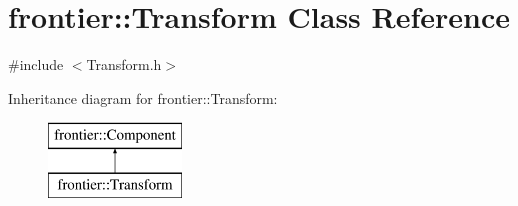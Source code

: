 \hypertarget{classfrontier_1_1_transform}{}\section{frontier\+:\+:Transform Class Reference}
\label{classfrontier_1_1_transform}


{\ttfamily \#include $<$Transform.\+h$>$}

Inheritance diagram for frontier\+:\+:Transform\+:\begin{figure}[H]
\begin{center}
\leavevmode
\includegraphics[height=2.000000cm]{classfrontier_1_1_transform}
\end{center}
\end{figure}
